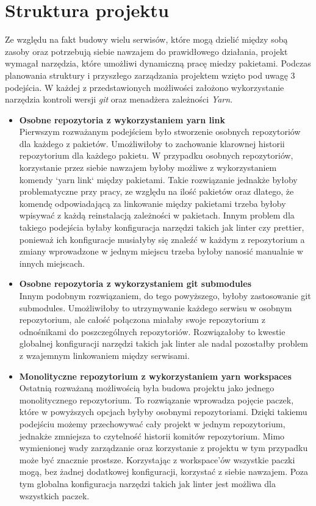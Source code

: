 \section{Struktura projektu}
Ze względu na fakt budowy wielu serwisów, które mogą dzielić między sobą zasoby oraz potrzebują siebie nawzajem do prawidłowego działania, projekt wymagał narzędzia, które umożliwi dynamiczną pracę miedzy pakietami. Podczas planowania struktury i przyszłego zarządzania projektem wzięto pod uwagę 3 podejścia. W każdej z przedstawionych możliwości założono wykorzystanie narzędzia kontroli wersji \textit{git} oraz menadżera zależności \textit{Yarn}.

\begin{itemize}
    \item \textbf {Osobne repozytoria z wykorzystaniem yarn link} \\
        Pierwszym rozważanym podejściem było stworzenie osobnych repozytoriów dla każdego z pakietów.
        Umożliwiłoby to zachowanie klarownej historii repozytorium dla każdego pakietu. W przypadku osobnych repozytoriów, korzystanie przez siebie nawzajem byłoby możliwe z wykorzystaniem komendy `yarn link` między pakietami. Takie rozwiązanie jednakże byłoby problematyczne przy pracy, ze względu na ilość pakietów oraz dlatego, że komendę odpowiadającą za linkowanie między pakietami trzeba byłoby wpisywać z każdą reinstalacją zależności w pakietach. Innym problem dla takiego podejścia byłaby konfiguracja narzędzi takich jak linter czy prettier, ponieważ ich konfiguracje musiałyby się znaleźć w każdym z repozytorium a zmiany wprowadzone w jednym miejscu trzeba byłoby nanosić manualnie w innych miejscach.\cite{YarnLinkDocs}

    \item \textbf {Osobne repozytoria z wykorzystaniem git submodules} \\
        Innym podobnym rozwiązaniem, do tego powyższego, byłoby zastosowanie git submodules. Umożliwiłoby to utrzymywanie każdego serwisu w osobnym repozytorium, ale całość połączona miałaby swoje repozytorium z odnośnikami do poszczególnych repozytoriów. Rozwiązałoby to kwestie globalnej konfiguracji narzędzi takich jak linter ale nadal pozostałby problem z wzajemnym linkowaniem między serwisami.\cite{GitSubmodulesDocs}

    \item \textbf {Monolityczne repozytorium z wykorzystaniem yarn workspaces} \\
        Ostatnią rozważaną możliwością była budowa projektu jako jednego monolitycznego repozytorium. To rozwiązanie wprowadza pojęcie paczek, które w powyższych opcjach byłyby osobnymi repozytoriami. Dzięki takiemu podejściu możemy przechowywać cały projekt w jednym repozytorium, jednakże zmniejsza to czytelność historii komitów repozytorium. Mimo wymienionej wady zarządzanie oraz korzystanie z projektu w tym przypadku może być znacznie prostsze. Korzystając z workspace'ów wszystkie paczki mogą, bez żadnej dodatkowej konfiguracji, korzystać z siebie nawzajem. Poza tym globalna konfiguracja narzędzi takich jak linter jest możliwa dla wszystkich paczek.\cite{YarnWorkspacesDocs}

\end{itemize}

